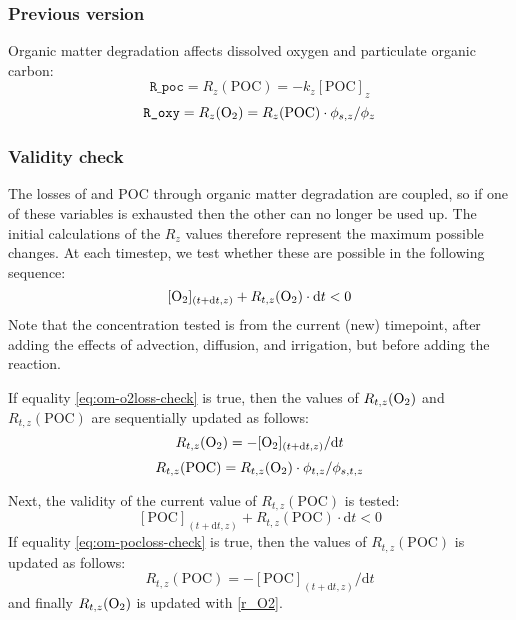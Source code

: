 \documentclass[a4paper]{article}
\newcommand{\D}[1]{\mathrm{d}#1}
\newcommand{\code}[1]{\texttt{#1}}
\begin{document}
\subsubsection{Previous version}

Organic matter degradation affects dissolved oxygen and particulate organic carbon:
\begin{equation}
\code{R\_poc} = R_z(\mathrm{POC}) = -k_z [\mathrm{POC}]_z
\end{equation}
\begin{equation}\label{r_O2}
\code{R\_oxy} = R_z(\ce{O2}) = R_z(\mathrm{POC}) \cdot \phi_{s,z} / \phi_z
\end{equation}


\subsubsection{Validity check}

The losses of  and POC through organic matter degradation are coupled, so if one of these variables is exhausted then the other can no longer be used up.  The initial calculations of the $R_z$ values therefore represent the maximum possible changes.  At each timestep, we test whether these are possible in the following sequence:
\begin{equation}\label{eq:om-o2loss-check}
[\ce{O2}]_{(t+\D{t}, z)} + R_{t,z}(\ce{O2}) \cdot \D{t} < 0
\end{equation}
Note that the  concentration tested is from the current (new) timepoint, after adding the effects of advection, diffusion, and irrigation, but before adding the reaction.

If equality \eqref{eq:om-o2loss-check} is true, then the values of $R_{t,z}(\ce{O2})$ and $R_{t,z}(\mathrm{POC})$ are sequentially updated as follows:
\begin{equation}
R_{t,z}(\ce{O2}) = -[\ce{O2}]_{(t+\D{t}, z)} / \D{t}
\end{equation}
\begin{equation}
R_{t,z}(\mathrm{POC}) = R_{t,z}(\ce{O2}) \cdot \phi_{t,z} / \phi_{s,t,z}
\end{equation}

Next, the validity of the current value of $R_{t,z}(\mathrm{POC})$ is tested:
\begin{equation}\label{eq:om-pocloss-check}
[\mathrm{POC}]_{(t+\D{t}, z)} + R_{t,z}(\mathrm{POC}) \cdot \D{t} < 0
\end{equation}
If equality \eqref{eq:om-pocloss-check} is true, then the values of $R_{t,z}(\mathrm{POC})$ is updated as follows:
\begin{equation}
R_{t,z}(\mathrm{POC}) = -[\mathrm{POC}]_{(t+\D{t}, z)} / \D{t}
\end{equation}
and finally $R_{t,z}(\ce{O2})$ is updated with \eqref{r_O2}.
\end{document}
